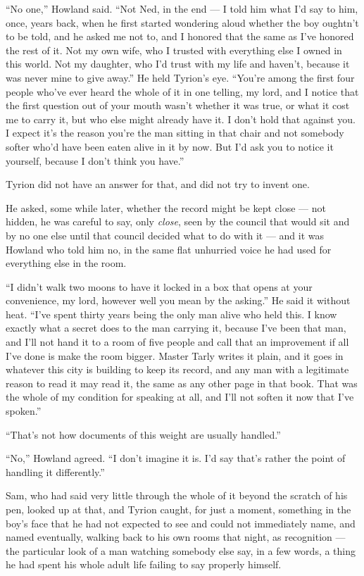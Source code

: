 “No one,” Howland said. “Not Ned, in the end — I told him what I’d say to him, once, years back, when he first started wondering aloud whether the boy oughtn’t to be told, and he asked me not to, and I honored that the same as I’ve honored the rest of it. Not my own wife, who I trusted with everything else I owned in this world. Not my daughter, who I’d trust with my life and haven’t, because it was never mine to give away.” He held Tyrion’s eye. “You’re among the first four people who’ve ever heard the whole of it in one telling, my lord, and I notice that the first question out of your mouth wasn’t whether it was true, or what it cost me to carry it, but who else might already have it. I don’t hold that against you. I expect it’s the reason you’re the man sitting in that chair and not somebody softer who’d have been eaten alive in it by now. But I’d ask you to notice it yourself, because I don’t think you have.”

Tyrion did not have an answer for that, and did not try to invent one.

\sceneBreak

He asked, some while later, whether the record might be kept close — not hidden, he was careful to say, only \textit{close}, seen by the council that would sit and by no one else until that council decided what to do with it — and it was Howland who told him no, in the same flat unhurried voice he had used for everything else in the room.

“I didn’t walk two moons to have it locked in a box that opens at your convenience, my lord, however well you mean by the asking.” He said it without heat. “I’ve spent thirty years being the only man alive who held this. I know exactly what a secret does to the man carrying it, because I’ve been that man, and I’ll not hand it to a room of five people and call that an improvement if all I’ve done is make the room bigger. Master Tarly writes it plain, and it goes in whatever this city is building to keep its record, and any man with a legitimate reason to read it may read it, the same as any other page in that book. That was the whole of my condition for speaking at all, and I’ll not soften it now that I’ve spoken.”

“That’s not how documents of this weight are usually handled.”

“No,” Howland agreed. “I don’t imagine it is. I’d say that’s rather the point of handling it differently.”

Sam, who had said very little through the whole of it beyond the scratch of his pen, looked up at that, and Tyrion caught, for just a moment, something in the boy’s face that he had not expected to see and could not immediately name, and named eventually, walking back to his own rooms that night, as recognition — the particular look of a man watching somebody else say, in a few words, a thing he had spent his whole adult life failing to say properly himself.

